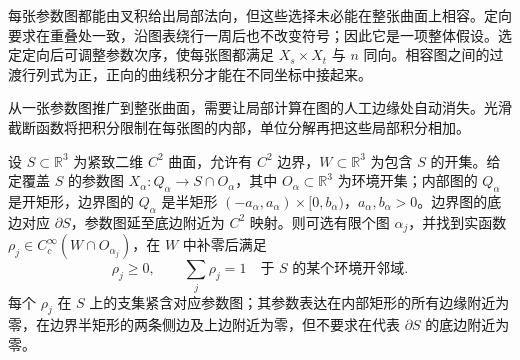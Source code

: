 每张参数图都能由叉积给出局部法向，但这些选择未必能在整张曲面上相容。定向要求在重叠处一致，沿图表绕行一周后也不改变符号；因此它是一项整体假设。选定定向后可调整参数次序，使每张图都满足 \(X_s\times X_t\) 与 \(n\) 同向。相容图之间的过渡行列式为正，正向的曲线积分才能在不同坐标中接起来。

\ProseParagraphBreak

从一张参数图推广到整张曲面，需要让局部计算在图的人工边缘处自动消失。光滑截断函数将把积分限制在每张图的内部，单位分解再把这些局部积分相加。

\begin{lemma}[紧致曲面的局部化]\label{b2:lem:01-surface-localization}
设 \(S\subset\mathbb R^3\) 为紧致二维 \(C^2\) 曲面，允许有 \(C^2\) 边界，\(W\subset\mathbb R^3\) 为包含 \(S\) 的开集。给定覆盖 \(S\) 的参数图 \(X_\alpha:Q_\alpha\to S\cap O_\alpha\)，其中 \(O_\alpha\subset\mathbb R^3\) 为环境开集；内部图的 \(Q_\alpha\) 是开矩形，边界图的 \(Q_\alpha\) 是半矩形 \((-a_\alpha,a_\alpha)\times[0,b_\alpha)\)，\(a_\alpha,b_\alpha>0\)。边界图的底边对应 \(\partial S\)，参数图延至底边附近为 \(C^2\) 映射。则可选有限个图 \(\alpha_j\)，并找到实函数 \(\rho_j\in C_c^\infty(W\cap O_{\alpha_j})\)，在 \(W\) 中补零后满足
\[
 \rho_j\geq0,\qquad \sum_j\rho_j=1
 \quad\text{于 }S\text{ 的某个环境开邻域}.
\]
每个 \(\rho_j\) 在 \(S\) 上的支集紧含对应参数图；其参数表达在内部矩形的所有边缘附近为零，在边界半矩形的两条侧边及上边附近为零，但不要求在代表 \(\partial S\) 的底边附近为零。
\end{lemma}
